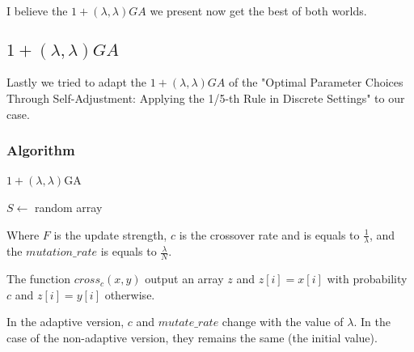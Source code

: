 \documentclass[12pt]{article}
\theoremstyle{definition}
\theoremstyle{plain}
\theoremstyle{remark}
\begin{document}
I believe the $1 + (\lambda, \lambda)GA$ we present now get the best of both worlds.

\subsection{$1 + (\lambda, \lambda)GA$}
Lastly we tried to adapt the $1 + (\lambda, \lambda)GA$ of the "Optimal Parameter Choices Through Self-Adjustment: Applying the 1/5-th Rule in Discrete Settings" to our case.

\subsubsection{Algorithm}
\begin{algorithm}[H]
	\caption{$1 + (\lambda, \lambda)$GA}
	$S \leftarrow$ random array\\
\end{algorithm}

Where $F$ is the update strength, $c$ is the crossover rate and is equals to $\frac{1}{\lambda}$, and the $mutation\_rate$ is equals to $\frac{\lambda}{N}$.

The function $cross_c(x, y)$ output an array $z$ and $z[i] = x[i]$ with probability $c$ and $z[i] = y[i]$ otherwise.

In the adaptive version, $c$ and $mutate\_rate$ change with the value of $\lambda$. In the case of the non-adaptive version, they remains the same (the initial value).
\end{document}
